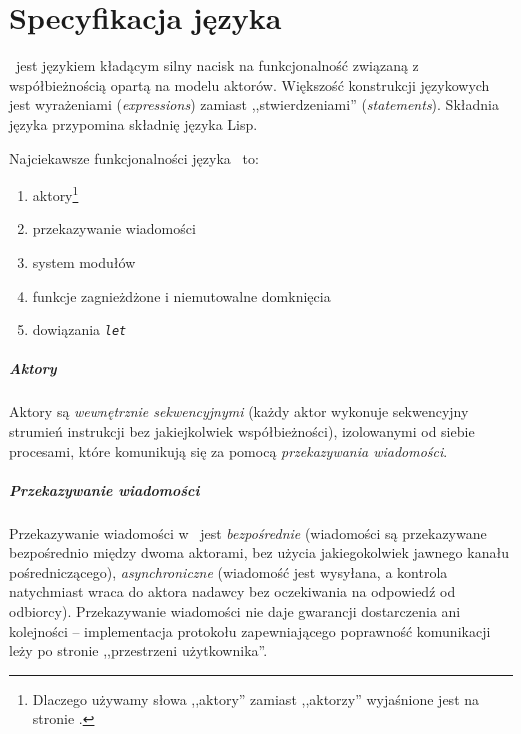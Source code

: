 \chapter{Specyfikacja języka \ViuAct}
\label{viuact_spec}
\label{specyfikacja_jezyka_viuact} %

\ViuAct\ jest językiem kładącym silny nacisk na funkcjonalność związaną z współbieżnością opartą na modelu
aktorów. Większość konstrukcji językowych jest wyrażeniami (\emph{expressions}) zamiast ,,stwierdzeniami''
(\emph{statements}). Składnia języka przypomina składnię języka Lisp.

Najciekawsze funkcjonalności języka \ViuAct\ to:

\begin{enumerate}
    \item aktory\footnote{Dlaczego używamy słowa ,,aktory'' zamiast ,,aktorzy''
        wyjaśnione jest na stronie \pageref{glossary_actors}.}
    \item przekazywanie wiadomości
    \item system modułów
    \item funkcje zagnieżdżone i niemutowalne domknięcia
    \item dowiązania \emph{\texttt{let}}
\end{enumerate}

\paragraph*{Aktory}

Aktory są \emph{wewnętrznie sekwencyjnymi} (każdy aktor wykonuje sekwencyjny strumień instrukcji bez
jakiejkolwiek współbieżności), izolowanymi od siebie procesami, które komunikują się za pomocą
\emph{przekazywania wiadomości}.

\paragraph*{Przekazywanie wiadomości}

Przekazywanie wiadomości w \ViuAct\ jest \emph{bezpośrednie} (wiadomości są
przekazywane bezpośrednio między dwoma aktorami, bez użycia jakiegokolwiek
jawnego kanału pośredniczącego), \emph{asynchroniczne} (wiadomość jest wysyłana,
a kontrola natychmiast wraca do aktora nadawcy bez oczekiwania na odpowiedź od
odbiorcy). Przekazywanie wiadomości nie daje gwarancji dostarczenia ani
kolejności -- implementacja protokołu zapewniającego poprawność komunikacji leży
po stronie ,,przestrzeni użytkownika''.

